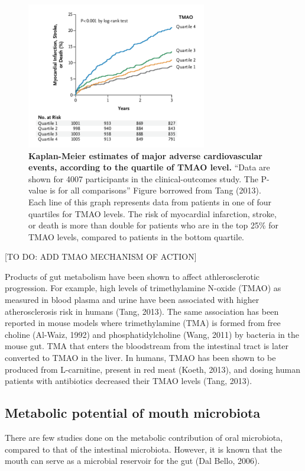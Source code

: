 \begin{figure}[h]
\begin{center}
\includegraphics[width=0.7\textwidth]{kaplan_meier.png}
\caption{\textbf{Kaplan-Meier estimates of major adverse cardiovascular events, according to the quartile of TMAO level.} “Data are shown for 4007 participants in the clinical-outcomes study. The P-value is for all comparisons” Figure borrowed from Tang (2013). Each line of this graph represents data from patients in one of four quartiles for TMAO levels. The risk of myocardial infarction, stroke, or death is more than double for patients who are in the top 25\% for TMAO levels, compared to patients in the bottom quartile.}
\end{center}
\end{figure}

[TO DO: ADD TMAO MECHANISM OF ACTION]

Products of gut metabolism have been shown to affect athlerosclerotic progression. For example, high levels of trimethylamine N-oxide (TMAO) as measured in blood plasma and urine have been associated with higher atherosclerosis risk in humans (Tang, 2013). The same association has been reported in mouse models where trimethylamine (TMA) is formed from free choline (Al-Waiz, 1992) and phosphatidylcholine (Wang, 2011) by bacteria in the mouse gut. TMA that enters the bloodstream from the intestinal tract is later converted to TMAO in the liver. In humans, TMAO has been shown to be produced from L-carnitine, present in red meat (Koeth, 2013), and dosing human patients with antibiotics decreased their TMAO levels (Tang, 2013).

\FloatBarrier

\subsection{Metabolic potential of mouth microbiota}
There are few studies done on the metabolic contribution of oral microbiota, compared to that of the intestinal microbiota. However, it is known that the mouth can serve as a microbial reservoir for the gut (Dal Bello, 2006).

